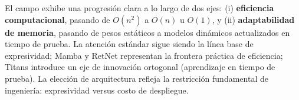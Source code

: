El campo exhibe una progresión clara a lo largo de dos ejes: (i) \textbf{eficiencia computacional}, pasando de $O(n^2)$ a $O(n)$ u $O(1)$, y (ii) \textbf{adaptabilidad de memoria}, pasando de pesos estáticos a modelos dinámicos actualizados en tiempo de prueba. La atención estándar sigue siendo la línea base de expresividad; Mamba y RetNet representan la frontera práctica de eficiencia; Titans introduce un eje de innovación ortogonal (aprendizaje en tiempo de prueba). La elección de arquitectura refleja la restricción fundamental de ingeniería: expresividad versus costo de despliegue.

